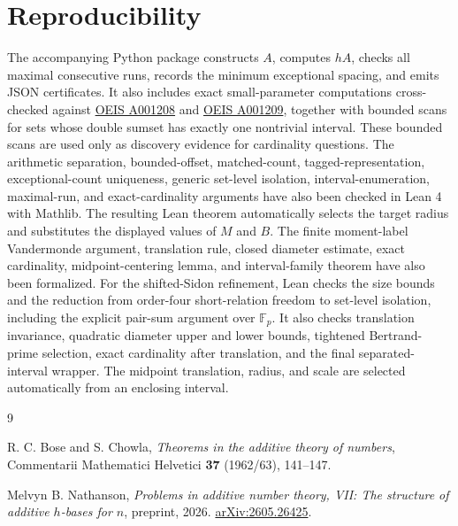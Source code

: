 \documentclass[11pt]{article}
\begin{document}
\section{Reproducibility}

The accompanying Python package constructs $A$, computes $hA$, checks all
maximal consecutive runs, records the minimum exceptional spacing, and emits
JSON certificates. It also includes exact small-parameter computations
cross-checked against \href{https://oeis.org/A001208}{OEIS A001208} and
\href{https://oeis.org/A001209}{OEIS A001209}, together with bounded scans for
sets whose double sumset has exactly one nontrivial interval. These bounded
scans are used only as discovery evidence for cardinality questions. The
arithmetic separation,
bounded-offset, matched-count, tagged-representation, exceptional-count
uniqueness, generic set-level isolation, interval-enumeration, maximal-run,
and exact-cardinality arguments have also been checked in Lean 4 with Mathlib.
The resulting Lean theorem automatically selects the target radius and
substitutes the displayed values of $M$ and $B$. The finite moment-label
Vandermonde argument, translation rule, closed diameter estimate, exact
cardinality, midpoint-centering lemma, and interval-family theorem have also
been formalized. For the shifted-Sidon refinement, Lean checks the size
bounds and the reduction from
order-four short-relation freedom to set-level isolation, including the
explicit pair-sum argument over $\mathbb F_p$. It also checks translation
invariance, quadratic diameter upper and lower bounds, tightened
Bertrand-prime selection, exact cardinality after translation, and the final
separated-interval wrapper. The midpoint translation, radius, and scale are
selected automatically from an enclosing interval.

\begin{thebibliography}{9}

R. C. Bose and S. Chowla,
\emph{Theorems in the additive theory of numbers},
Commentarii Mathematici Helvetici \textbf{37} (1962/63), 141--147.

Melvyn B. Nathanson,
\emph{Problems in additive number theory, VII: The structure of additive
$h$-bases for $n$},
preprint, 2026.
\href{https://arxiv.org/abs/2605.26425}{arXiv:2605.26425}.

\end{thebibliography}
\end{document}

